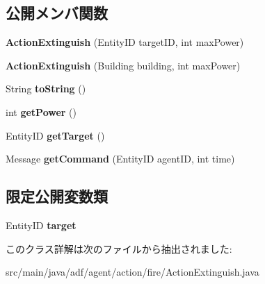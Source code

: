 \subsection*{公開メンバ関数}
\begin{DoxyCompactItemize}
\item 
\hypertarget{classadf_1_1agent_1_1action_1_1fire_1_1ActionExtinguish_a71b5feb48519721e31eb8d8b9ec24b56}{}\label{classadf_1_1agent_1_1action_1_1fire_1_1ActionExtinguish_a71b5feb48519721e31eb8d8b9ec24b56} 
{\bfseries Action\+Extinguish} (Entity\+ID target\+ID, int max\+Power)
\item 
\hypertarget{classadf_1_1agent_1_1action_1_1fire_1_1ActionExtinguish_a9bb366ec06f181b38dd161d24f32ab6c}{}\label{classadf_1_1agent_1_1action_1_1fire_1_1ActionExtinguish_a9bb366ec06f181b38dd161d24f32ab6c} 
{\bfseries Action\+Extinguish} (Building building, int max\+Power)
\item 
\hypertarget{classadf_1_1agent_1_1action_1_1fire_1_1ActionExtinguish_a409f07138feced350503502b98075b8f}{}\label{classadf_1_1agent_1_1action_1_1fire_1_1ActionExtinguish_a409f07138feced350503502b98075b8f} 
String {\bfseries to\+String} ()
\item 
\hypertarget{classadf_1_1agent_1_1action_1_1fire_1_1ActionExtinguish_a300cc94f9d9af74310dcc86ff5a254a4}{}\label{classadf_1_1agent_1_1action_1_1fire_1_1ActionExtinguish_a300cc94f9d9af74310dcc86ff5a254a4} 
int {\bfseries get\+Power} ()
\item 
\hypertarget{classadf_1_1agent_1_1action_1_1fire_1_1ActionExtinguish_af47ac8ae164313f7ce8ee7035e2095b0}{}\label{classadf_1_1agent_1_1action_1_1fire_1_1ActionExtinguish_af47ac8ae164313f7ce8ee7035e2095b0} 
Entity\+ID {\bfseries get\+Target} ()
\item 
\hypertarget{classadf_1_1agent_1_1action_1_1fire_1_1ActionExtinguish_a4aea8c37d2298767efb3c05c63414960}{}\label{classadf_1_1agent_1_1action_1_1fire_1_1ActionExtinguish_a4aea8c37d2298767efb3c05c63414960} 
Message {\bfseries get\+Command} (Entity\+ID agent\+ID, int time)
\end{DoxyCompactItemize}
\subsection*{限定公開変数類}
\begin{DoxyCompactItemize}
\item 
\hypertarget{classadf_1_1agent_1_1action_1_1fire_1_1ActionExtinguish_af2154ee8ad5aac2e8dea5e13d70432f2}{}\label{classadf_1_1agent_1_1action_1_1fire_1_1ActionExtinguish_af2154ee8ad5aac2e8dea5e13d70432f2} 
Entity\+ID {\bfseries target}
\end{DoxyCompactItemize}


このクラス詳解は次のファイルから抽出されました\+:\begin{DoxyCompactItemize}
\item 
src/main/java/adf/agent/action/fire/Action\+Extinguish.\+java\end{DoxyCompactItemize}
